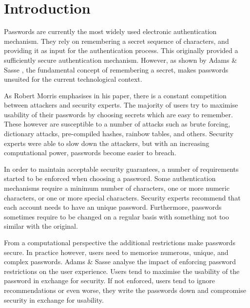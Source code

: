 
\chapter{Introduction} %

\label{Chapter1}


Passwords are currently the most widely used electronic authentication mechanism. They rely on remembering a secret sequence of characters, and providing it as input for the authentication process. This originally provided a sufficiently secure authentication mechanism. However, as shown by Adams \& Sasse \cite{adams1999users}, the fundamental concept of remembering a secret, makes passwords unsuited for the current technological context. 

As Robert Morris \cite{morris1979password} emphasises in his paper, there is a constant competition between attackers and security experts. The majority of users try to maximise usability of their passwords by choosing secrets which are easy to remember. These however are susceptible to a number of attacks such as brute forcing, dictionary attacks, pre-compiled hashes, rainbow tables, and others. Security experts were able to slow down the attackers, but with an increasing computational power, passwords become easier to breach. 

In order to maintain acceptable security guarantees, a number of requirements started to be enforced when choosing a password. Some authentication mechanisms require a minimum number of characters, one or more numeric characters, or one or more special characters. Security experts recommend that each account needs to have an unique password. Furthermore, passwords sometimes require to be changed on a regular basis with something not too similar with the original. 

From a computational perspective the additional restrictions make passwords secure. In practice however, users need to memorise numerous, unique, and complex passwords. Adams \& Sasse \cite{adams1999users} analyse the impact of enforcing password restrictions on the user experience. Users tend to maximise the usability of the password in exchange for security. If not enforced, users tend to ignore recommendations or even worse, they write the passwords down and compromise security in exchange for usability.

